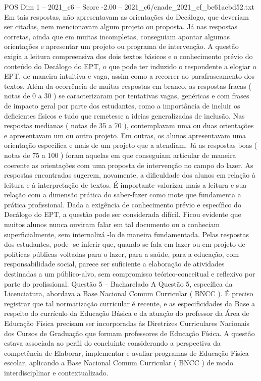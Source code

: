 \begin{textsample}{POS Dim 1 – 2021\_c6 – Score -2.00 – 2021\_c6/enade\_2021\_ef\_be61acbd52.txt}
Em tais respostas, não apresentavam as orientações do Decálogo, que deveriam ser citadas, nem mencionavam algum projeto ou proposta.
Já nas respostas corretas, ainda que em muitas incompletas, conseguiam apontar algumas orientações e apresentar um projeto ou programa de intervenção.
A questão exigia a leitura compreensiva dos dois textos básicos e o conhecimento prévio do conteúdo do Decálogo do EPT, o que pode ter induzido o respondente a elogiar o EPT, de maneira intuitiva e vaga, assim como a recorrer ao parafraseamento dos textos.
Além da ocorrência de muitas respostas em branco, as respostas fracas ( notas de 0 a 30 ) se caracterizaram por tentativas vagas, genéricas e com frases de impacto geral por parte dos estudantes, como a importância de incluir os deficientes físicos e tudo que remetesse a ideias generalizadas de inclusão.
Nas respostas medianas ( notas de 35 a 70 ), contemplavam uma ou duas orientações e apresentavam um ou outro projeto.
Em outras, os alunos apresentavam uma orientação específica e mais de um projeto que a atendiam.
Já as respostas boas ( notas de 75 a 100 ) foram aquelas em que conseguiam articular de maneira coerente as orientações com uma proposta de intervenção no campo do lazer.
As respostas encontradas sugerem, novamente, a dificuldade dos alunos em relação à leitura e à interpretação de textos.
É importante valorizar mais a leitura e sua relação com a dimensão prática do saber-fazer como mote que fundamenta a prática profissional.
Dada a exigência de conhecimento prévio e específico do Decálogo do EPT, a questão pode ser considerada difícil.
Ficou evidente que muitos alunos nunca ouviram falar em tal documento ou o conheciam superficialmente, sem internalizá -lo de maneira fundamentada.
Pelas respostas dos estudantes, pode -se inferir que, quando se fala em lazer ou em projeto de políticas públicas voltadas para o lazer, para a saúde, para a educação, com responsabilidade social, parece ser suficiente a elaboração de atividades destinadas a um público-alvo, sem compromisso teórico-conceitual e reflexivo por parte do profissional.
Questão 5 – Bacharelado A Questão 5, específica da Licenciatura, abordava a Base Nacional Comum Curricular ( BNCC ).
É preciso registrar que tal normatização curricular é recente, e as especificidades da Base a respeito do currículo da Educação Básica e da atuação do professor da Área de Educação Física precisam ser incorporadas às Diretrizes Curriculares Nacionais dos Cursos de Graduação que formam professores de Educação Física.
A questão estava associada ao perfil do concluinte considerando a perspectiva da competência de Elaborar, implementar e avaliar programas de Educação Física escolar, aplicando a Base Nacional Comum Curricular ( BNCC ) de modo interdisciplinar e contextualizado.

\end{textsample}
